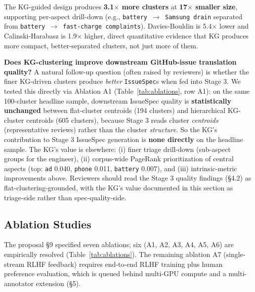 \documentclass[sigconf, nonacm, anonymous, balance=false]{acmart}
\begin{document}
The KG-guided design produces \textbf{3.1$\times$ more clusters} at \textbf{17$\times$ smaller size}, supporting per-aspect drill-down (e.g., \texttt{battery $\to$ Samsung drain} separated from \texttt{battery $\to$ fast-charge complaints}). Davies-Bouldin is 5.4$\times$ lower and Calinski-Harabasz is 1.9$\times$ higher, direct quantitative evidence that KG produces more compact, better-separated clusters, not just more of them.

\textbf{Does KG-clustering improve downstream GitHub-issue translation quality?} A natural follow-up question (often raised by reviewers) is whether the finer KG-driven clusters produce \emph{better} \texttt{IssueSpec}s when fed into Stage 3. We tested this directly via Ablation A1 (Table~\ref{tab:ablations}, row A1): on the same 100-cluster headline sample, downstream IssueSpec quality is \textbf{statistically unchanged} between flat-cluster centroids (194 clusters) and hierarchical KG-cluster centroids (605 clusters), because Stage 3 reads cluster \emph{centroids} (representative reviews) rather than the cluster \emph{structure}. So the KG's contribution to Stage 3 IssueSpec generation is \textbf{none directly} on the headline sample. The KG's value is elsewhere: (i) finer triage drill-down (sub-aspect groups for the engineer), (ii) corpus-wide PageRank \cite{page1999pagerank} prioritization of central aspects (top: \texttt{ad} 0.040, \texttt{phone} 0.011, \texttt{battery} 0.007), and (iii) intrinsic-metric improvements above. Reviewers should read the Stage 3 quality findings (\S4.2) as flat-clustering-grounded, with the KG's value documented in this section as triage-side rather than spec-quality-side.

\subsection{Ablation Studies}\label{ablation-studies}

The proposal §9 specified seven ablations; six (A1, A2, A3, A4, A5, A6) are empirically resolved (Table~\ref{tab:ablations}). The remaining ablation A7 (single-stream RLHF feedback) requires end-to-end RLHF training plus human preference evaluation, which is queued behind multi-GPU compute and a multi-annotator extension (§5).
\end{document}
